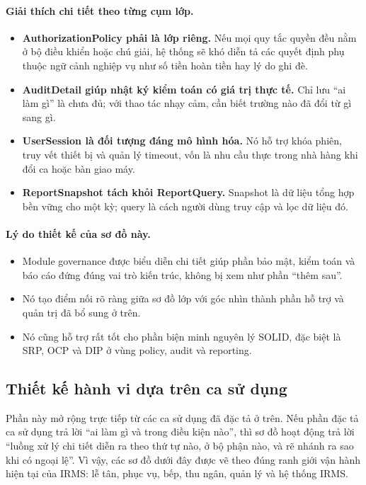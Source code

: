 \documentclass[11pt,a4paper]{article}
\begin{document}
\paragraph{Giải thích chi tiết theo từng cụm lớp.}
\begin{itemize}
  \item \textbf{AuthorizationPolicy phải là lớp riêng.} Nếu mọi quy tắc quyền đều nằm ở bộ điều khiển hoặc chú giải, hệ thống sẽ khó diễn tả các quyết định phụ thuộc ngữ cảnh nghiệp vụ như số tiền hoàn tiền hay lý do ghi đè.
  \item \textbf{AuditDetail giúp nhật ký kiểm toán có giá trị thực tế.} Chỉ lưu \enquote{ai làm gì} là chưa đủ; với thao tác nhạy cảm, cần biết trường nào đã đổi từ gì sang gì.
  \item \textbf{UserSession là đối tượng đáng mô hình hóa.} Nó hỗ trợ khóa phiên, truy vết thiết bị và quản lý timeout, vốn là nhu cầu thực trong nhà hàng khi đổi ca hoặc bàn giao máy.
  \item \textbf{ReportSnapshot tách khỏi ReportQuery.} Snapshot là dữ liệu tổng hợp bền vững cho một kỳ; query là cách người dùng truy cập và lọc dữ liệu đó.
\end{itemize}

\paragraph{Lý do thiết kế của sơ đồ này.}
\begin{itemize}
  \item Module governance được biểu diễn chi tiết giúp phần bảo mật, kiểm toán và báo cáo đứng đúng vai trò kiến trúc, không bị xem như phần \enquote{thêm sau}.
  \item Nó tạo điểm nối rõ ràng giữa sơ đồ lớp với góc nhìn thành phần hỗ trợ và quản trị đã bổ sung ở trên.
  \item Nó cũng hỗ trợ rất tốt cho phần biện minh nguyên lý SOLID, đặc biệt là SRP, OCP và DIP ở vùng policy, audit và reporting.
\end{itemize}


\subsection{Thiết kế hành vi dựa trên ca sử dụng}
Phần này mở rộng trực tiếp từ các ca sử dụng đã đặc tả ở trên. Nếu phần đặc tả ca sử dụng trả lời \enquote{ai làm gì và trong điều kiện nào}, thì sơ đồ hoạt động trả lời \enquote{luồng xử lý chi tiết diễn ra theo thứ tự nào, ở bộ phận nào, và rẽ nhánh ra sao khi có ngoại lệ}. Vì vậy, các sơ đồ dưới đây được vẽ theo đúng ranh giới vận hành hiện tại của IRMS: lễ tân, phục vụ, bếp, thu ngân, quản lý và hệ thống IRMS.
\end{document}
